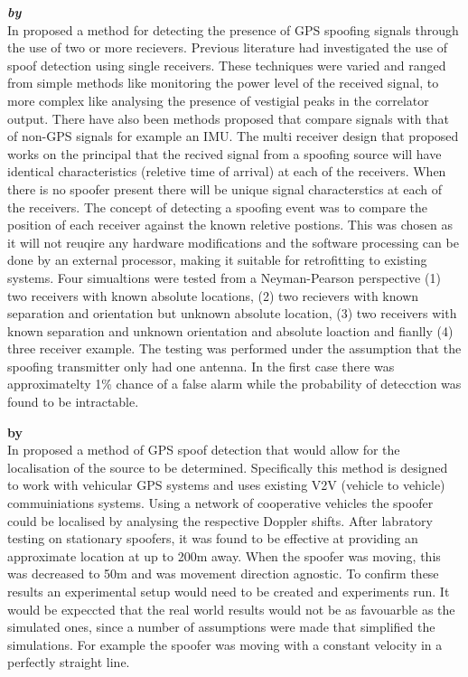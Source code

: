 \medskip

\textbf{\emph{ by \citeauthor{RN10}}} \\
In \citeyear{RN10} \citeauthor{RN10} \cite{RN10} proposed a method for detecting the presence of GPS spoofing signals through the use of two or more recievers. Previous
literature had investigated the use of spoof detection using single receivers. These techniques were varied and ranged from simple methods like monitoring the power level
of the received signal, to more complex like analysing the presence of vestigial peaks in the correlator output. There have also been methods proposed that compare
signals with that of non-GPS signals for example an IMU. The multi receiver design that \citeauthor{RN10} proposed works on the principal that the recived signal from a
spoofing source will have identical characteristics (reletive time of arrival) at each of the receivers. When there is no spoofer present there will be unique signal
characterstics at each of the receivers. The concept of detecting a spoofing event was to compare the position of each receiver against the known reletive postions. This
was chosen as it will not reuqire any hardware modifications and the software processing can be done by an external processor, making it suitable for retrofitting to
existing systems. Four simualtions were tested from a Neyman-Pearson perspective  (1) two receivers with known
absolute locations, (2) two recievers with known separation and orientation but unknown absolute location, (3) two receivers with known separation and unknown orientation
and absolute loaction and fianlly (4) three receiver example. The testing was performed under the assumption that the spoofing transmitter only had one antenna. In the
first case there was approximatelty 1\% chance of a false alarm while the probability of detecction was found to be intractable.

\medskip

\textbf{\emph{} by \citeauthor{RN1}} \\
In \citeyear{RN1} \citeauthor{RN1} \cite{RN1} proposed a method of GPS spoof detection that would allow for the localisation
of the source to be determined. Specifically this method is designed to work with vehicular GPS systems and uses existing 
V2V (vehicle to vehicle) commuiniations systems. Using a network of cooperative vehicles the spoofer could be localised by analysing the respective
Doppler shifts. After labratory testing on stationary spoofers, it was found to be effective at providing an approximate location at up to 200m away.
When the spoofer was moving, this was decreased to 50m and was movement direction agnostic. To confirm these results an experimental setup would need
to be created and experiments run. It would be expeccted that the real world results would not be as favouarble as the simulated ones, since a number of
assumptions were made that simplified the simulations. For example the spoofer was moving with a constant velocity in a perfectly straight line.

